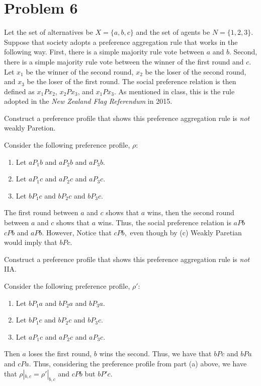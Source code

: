 \documentclass[11pt]{article}
\begin{document}
\section*{Problem 6}
\begin{problem}
    Let the set of alternatives be $X = \{a,b,c\}$ and the set of agents be $N = \{1,2,3\}$. Suppose that society adopts a preference
aggregation rule that works in the following way. First, there is a simple majority
rule vote between $a$ and $b$. Second, there is a simple majority rule vote between
the winner of the first round and $c$. Let $x_1$ be the winner of the second round,
$x_2$ be the loser of the second round, and $x_3$ be the loser of the first round.
The social preference relation is then defined as $x_1 P x_2$, $x_2 P x_3$, and
$x_1 P x_3$. As mentioned in class, this is the rule adopted in the \textit{New
Zealand Flag Referendum} in 2015.
\begin{itemize}
\begin{problem}
\item Construct a preference profile that shows this preference aggregation rule is \textit{not} weakly Paretion.
\end{problem}
\begin{solution} Consider the following preference profile, $\rho$:
\begin{enumerate}
    \item Let $aP_1b$ and $aP_2b$ and $aP_3b.$
    \item Let $aP_1c$ and $aP_2c$ and $aP_3c.$
    \item Let $bP_1c$ and $bP_2c$ and $bP_3c.$
\end{enumerate}
The first round between $a$ and $c$ shows that $a$ wins, then the second round between $a$ and $c$ shows that $a$ wins. Thus, the social preference relation is $aPb$ $cPb$ and $aPb.$ However, Notice that $cPb,$ even though by (c) Weakly Paretian would imply that $bPc.$
\end{solution}
\begin{problem}
\item Construct a preference profile that shows this preference
aggregation rule is \textit{not} IIA.
\end{problem}
\begin{solution}
    Consider the following preference profile, $\rho'$:
    \begin{enumerate}
    \item Let $bP_1a$ and $bP_2a$ and $bP_3a.$
    \item Let $bP_1c$ and $bP_2c$ and $bP_3c.$
    \item Let $aP_1c$ and $aP_2c$ and $aP_3c.$
\end{enumerate}
Then $a$ loses the first round, $b$ wins the second. Thus, we have that $bPc$ and $bPa$ and $cPa.$ Thus, considering the preference profile from part (a) above, we have that $\rho|_{b,c} = \rho'|_{b,c}$ and $cPb$ but $bP'c.$
\end{solution}

\end{itemize}    

\end{problem}
\end{document}
